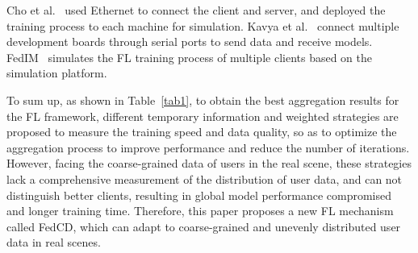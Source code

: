 \documentclass[twoside,twocolumn]{article}
\begin{document}
\begin{spacing}{1.0}
	Cho et al.~\cite{cho2021personalized} used Ethernet to connect the client and server, and deployed the training process to each machine for simulation. Kavya et al.~\cite{kopparapu2022tinyfedtl} connect multiple development boards through serial ports to send data and receive models. FedIM~\cite{gao2021fedim} simulates the FL training process of multiple clients based on the simulation platform.

	To sum up, as shown in Table~\ref{tab1}, to obtain the best aggregation results for the FL framework, different temporary information and weighted strategies are proposed to measure the training speed and data quality, so as to optimize the aggregation process to improve performance and reduce the number of iterations. However, facing the coarse-grained data of users in the real scene, these strategies lack a comprehensive measurement of the distribution of user data, and can not distinguish better clients, resulting in global model performance compromised and longer training time. Therefore, this paper proposes a new FL mechanism called FedCD, which can adapt to coarse-grained and unevenly distributed user data in real scenes.


\end{spacing}
\end{document}
